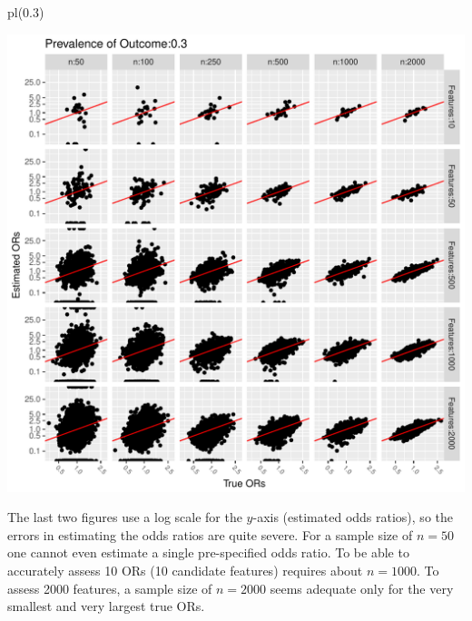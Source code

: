 \begin{Schunk}
\begin{Sinput}
pl(0.3)
\end{Sinput}


\centerline{\includegraphics{hdata-simor-plotb-1} }

\end{Schunk}
The last two figures use a log scale for the $y$-axis (estimated odds
ratios), so the errors in estimating the odds ratios are quite
severe.  For a sample size of $n=50$ one cannot even estimate a single
pre-specified odds ratio.  To be able to accurately assess 10 ORs (10
candidate features) requires about $n=1000$.  To assess 2000 features,
a sample size of $n=2000$ seems adequate only for the very smallest
and very largest true ORs.

